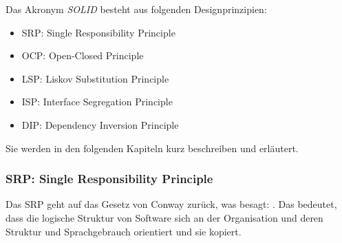 Das Akronym \textit{SOLID} besteht aus folgenden Designprinzipien:

\begin{itemize}
\item SRP: Single Responsibility Principle
\item OCP: Open-Closed Principle
\item LSP: Liskov Substitution Principle
\item ISP: Interface Segregation Principle
\item DIP: Dependency Inversion Principle
\end{itemize}

Sie werden in den folgenden Kapiteln kurz beschreiben und erläutert.






\subsubsection{SRP: Single Responsibility Principle}

Das \ac{SRP} geht auf das Gesetz von Conway zurück, was besagt: 
. Das bedeutet, dass die logische Struktur von Software sich an der Organisation und deren Struktur und Sprachgebrauch orientiert und sie kopiert.

